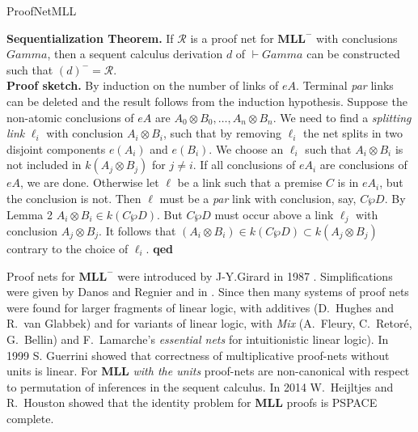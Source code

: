 \begin{entry}{ProofNetMLL}
\begin{clarifications}
\begin{enumerate}
\vspace{1ex}

\noindent
{\bf Sequentialization Theorem.} 
If $\mathcal{R}$ is a proof net for $\mathbf{MLL}^-$ with conclusions $Gamma$,
then a sequent calculus derivation $d$ of $\vdash Gamma$ can be constructed such that 
$(d)^{-} = \mathcal{R}$. \\
\textbf{Proof sketch.} By induction on the number of links of $eA$. 
Terminal \emph{par} links can be deleted and the result follows from the induction hypothesis. 
Suppose the non-atomic conclusions of $eA$ are $A_0\otimes B_0, \ldots, A_n\otimes B_n$.  
We need to find a \emph{splitting link} $\ell_i$ with conclusion  $A_i \otimes B_i$, such that by removing $\ell_i$ the net splits in two disjoint components  $e(A_i)$ and $e(B_i)$. 
We choose an $\ell_i$ such that  $A_i\otimes B_i$ is not included in $k(A_j\otimes B_j)$ for $j\neq i$. 
%
%
If all conclusions of $eA_i$  are conclusions of $eA$, we are done.
Otherwise let $\ell$ be a link such that a premise $C$ is in $eA_i$, but 
the conclusion is not. Then $\ell$ must be a \emph{par} link with conclusion, say, $C \wp D$. 
By Lemma 2 $A_i\otimes B_i \in k(C\wp D)$.  But $C\wp D$ must occur above a link 
$\ell_j$ with conclusion $A_j\otimes B_j$. It follows that 
$(A_i\otimes B_i) \in k(C\wp D) \subset k(A_j\otimes B_j)$
contrary to the choice of $\ell_i$. {\bf qed}

\end{enumerate}

\end{clarifications}

\begin{history}
Proof nets for $\mathbf{MLL}^-$ were introduced by J-Y.Girard in 1987 \cite{Girard}. 
Simplifications were given by Danos and Regnier \cite{DanosRegnier} and in \cite{BellinDeWiele}.  
Since then many systems of proof nets were found for larger fragments of linear logic, with additives (D.~Hughes and R.~van Glabbek) and for variants of linear logic, with \emph{Mix} (A.~Fleury, C.~Retor\'e, G.~Bellin) and F.~Lamarche's \emph{essential nets} for intuitionistic linear logic). 
In 1999 S. Guerrini showed that correctness of multiplicative proof-nets without units is linear.
For {\bf MLL} \emph{with the units} proof-nets are non-canonical with respect to permutation of inferences in the sequent calculus. In 2014 W.~Heijltjes and R.~Houston showed that the identity problem for {\bf MLL} proofs is PSPACE complete. 
\end{history}



\end{entry}
